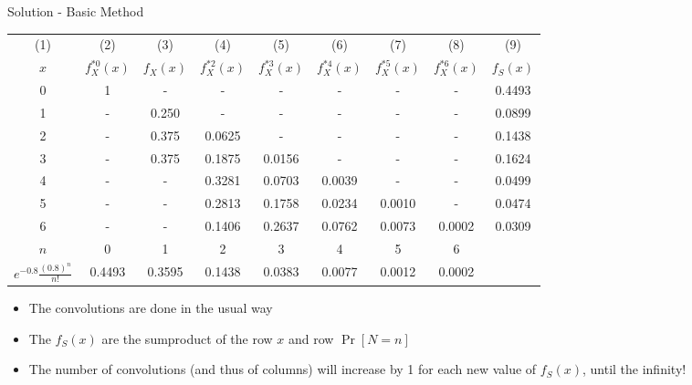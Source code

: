\documentclass[11pt]{beamer}
\begin{document}
\begin{frame}[t]{Solution - Basic Method}
\begin{center}
\tiny
\begin{tabular}{ccccccccc}
\hline
(1) & (2) & (3) & (4) & (5) & (6) & (7) & (8) & (9) \\
$x$ & $f_X^{\ast 0}\left( x\right) $ & $f_X\left( x\right) $ &
$f^{\ast 2}_X\left(
x\right) $ & $f_X^{\ast 3}\left( x\right) $ & $f_X^{\ast 4}\left( x\right) $ & $%
f_X^{\ast 5}\left( x\right) $ & $f_X^{\ast 6}\left( x\right) $ &
$f_{S}\left( x\right) $ \\ \hline\hline
0 & 1 & - & - & - & - & - & - & 0.4493 \\
1 & - & 0.250 & - & - & - & - & - & 0.0899 \\
2 & - & 0.375 & 0.0625 & - & - & - & - & 0.1438 \\
3 & - & 0.375 & 0.1875 & 0.0156 & - & - & - & 0.1624 \\
4 & - & - & 0.3281 & 0.0703 & 0.0039 & - & - & 0.0499 \\
5 & - & - & 0.2813 & 0.1758 & 0.0234 & 0.0010 & - & 0.0474 \\
6 & - & - & 0.1406 & 0.2637 & 0.0762 & 0.0073 & 0.0002 & 0.0309 \\ \hline
$n$ & 0 & 1 & 2 & 3 & 4 & 5 & 6 &  \\
$e^{-0.8}\frac{\left( 0.8\right) ^{n}}{n!}$ & 0.4493 & 0.3595 &
0.1438 & 0.0383 & 0.0077 & 0.0012 & 0.0002 &  \\ \hline
\end{tabular}
\end{center}
\begin{itemize}
\item The convolutions are done in the usual way
\item The $f_S(x)$ are the sumproduct of the row $x$ and row $\Pr[N=n]$
\item The number of convolutions (and thus of columns) will increase by 1 for each new value of $f_S(x)$, until the infinity!
\end{itemize}
\end{frame}
\end{document}
